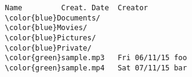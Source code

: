 \begin{Verbatim}[commandchars=\\\{\},codes={\catcode`$=3\catcode`^=7\catcode`_=8},frame=single]
Name         Creat. Date  Creator
\color{blue}Documents/
\color{blue}Movies/
\color{blue}Pictures/
\color{blue}Private/
\color{green}sample.mp3   Fri 06/11/15 foo
\color{green}sample.mp4   Sat 07/11/15 bar
\end{Verbatim}